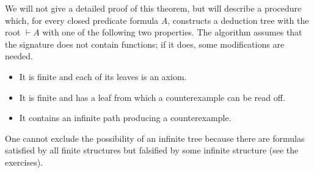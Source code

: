 We will not give a detailed proof of this theorem, but will describe a procedure which, for every closed predicate formula $A$,
constructs a deduction tree with the root $\vdash A$ with one of the following two properties.
The algorithm assumes that the signature does not contain functions; if it does, some modifications are needed.

\begin{itemize}
\item
It is finite and each of its leaves is an axiom.
\item
It is finite and has a leaf from which a counterexample can be read off.
\item
It contains an infinite path producing a counterexample.
\end{itemize}

One cannot exclude the possibility of an infinite tree because there are formulas satisfied by all finite structures
but falsified by some infinite structure (see the exercises).

